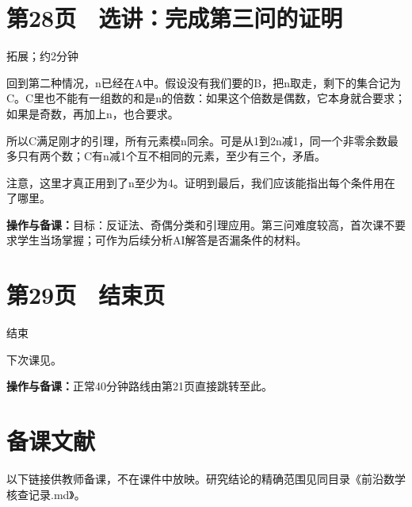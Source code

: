 \documentclass[UTF8,a4paper,11pt,fontset=fandol]{ctexart}
\newcommand{\tip}[1]{\par{\small\color{black!65}\noindent\textbf{操作与备课：}#1\par}}
\begin{document}
\par\noindent\begin{minipage}{\linewidth}

\section*{第28页　选讲：完成第三问的证明}

{\small\noindent 拓展；约2分钟\par}

回到第二种情况，n已经在A中。假设没有我们要的B，把n取走，剩下的集合记为C。C里也不能有一组数的和是n的倍数：如果这个倍数是偶数，它本身就合要求；如果是奇数，再加上n，也合要求。

所以C满足刚才的引理，所有元素模n同余。可是从1到2n减1，同一个非零余数最多只有两个数；C有n减1个互不相同的元素，至少有三个，矛盾。

注意，这里才真正用到了n至少为4。证明到最后，我们应该能指出每个条件用在了哪里。

\tip{目标：反证法、奇偶分类和引理应用。第三问难度较高，首次课不要求学生当场掌握；可作为后续分析AI解答是否漏条件的材料。}

\end{minipage}\par\vspace{2mm}

\par\noindent\begin{minipage}{\linewidth}

\section*{第29页　结束页}

{\small\noindent 结束\par}

下次课见。

\tip{正常40分钟路线由第21页直接跳转至此。}

\end{minipage}\par\vspace{2mm}

\par\vspace{5mm}\section*{备课文献}

以下链接供教师备课，不在课件中放映。研究结论的精确范围见同目录《前沿数学核查记录.md》。
\end{document}
